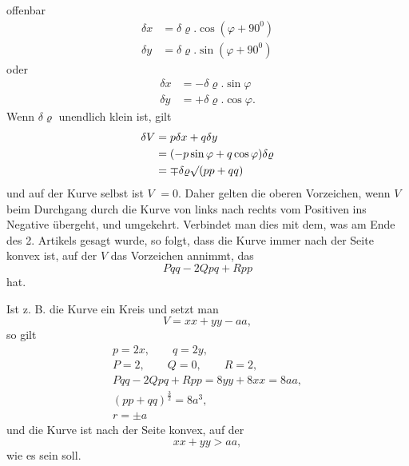%
offenbar
\[
\begin{aligned}
\delta x&=\delta\varrho.\cos(\varphi+90^{0})\\
\delta y&=\delta\varrho.\sin(\varphi+90^{0})
\end{aligned}
\]
oder
\[
\begin{aligned}
\delta x&=-\delta\varrho.\sin\varphi\\
\delta y&=+\delta\varrho.\cos\varphi.
\end{aligned}
\]
Wenn $\delta\varrho$ unendlich klein ist, gilt
\[
\begin{aligned}
\delta V&=p\delta x+q\delta y\\
&=(-p\sin\varphi+q\cos\varphi)\delta\varrho\\
&=\mp\delta\varrho\mathord{\surd}(pp+qq)
\end{aligned}
\]
und auf der Kurve selbst ist $V$ $=0$. Daher gelten die oberen Vorzeichen, wenn $V$ beim Durchgang durch die Kurve von links nach rechts vom Positiven ins Negative übergeht, und umgekehrt. Verbindet man dies mit dem, was am Ende des 2. Artikels gesagt wurde, so folgt, dass die Kurve immer nach der Seite konvex ist, auf der $V$ das Vorzeichen annimmt, das
\[
Pqq-2Qpq+Rpp
\]
hat.

Ist z. B. die Kurve ein Kreis und setzt man
\[
V=xx+yy-aa,
\]
so gilt
\[
\begin{gathered}
p=2x,\qquad q=2y,\\
P=2,\qquad Q=0,\qquad R=2,\\
Pqq-2Qpq+Rpp=8yy+8xx=8aa,\\
(pp+qq)^{\frac32}=8a^3,\\
r=\pm a
\end{gathered}
\]
und die Kurve ist nach der Seite konvex, auf der
\[
xx+yy>aa,
\]
wie es sein soll.
